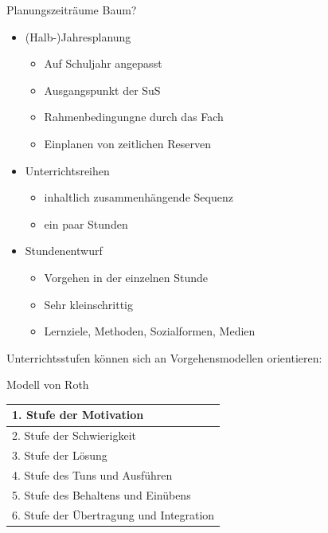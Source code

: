 \documentclass{article}
\begin{document}
\begin{block}{Planungszeiträume}
    Baum?
    \begin{itemize}
        \item (Halb-)Jahresplanung
        \begin{itemize}
            \item Auf Schuljahr angepasst
            \item Ausgangspunkt der SuS
            \item Rahmenbedingungne durch das Fach
            \item Einplanen von zeitlichen Reserven
        \end{itemize}
        \item Unterrichtsreihen
        \begin{itemize}
            \item inhaltlich zusammenhängende Sequenz
            \item ein paar Stunden
        \end{itemize}
        \item Stundenentwurf
        \begin{itemize}
            \item Vorgehen in der einzelnen Stunde
            \item Sehr kleinschrittig
            \item Lernziele, Methoden, Sozialformen, Medien
        \end{itemize}
    \end{itemize}
\end{block}

Unterrichtsstufen können sich an Vorgehensmodellen orientieren:
\begin{block}{Modell von Roth}
    \centering
    \begin{tabular}{|p{10cm}|}
            \hline
            1. Stufe der Motivation \\
            \hline
            2. Stufe der Schwierigkeit \\
            \hline
            3. Stufe der Lösung \\
            \hline
            4. Stufe des Tuns und Ausführen \\
            \hline
            5. Stufe des Behaltens und Einübens \\
            \hline
            6. Stufe der Übertragung und Integration \\
            \hline
        \end{tabular}
\end{block}
\end{document}
